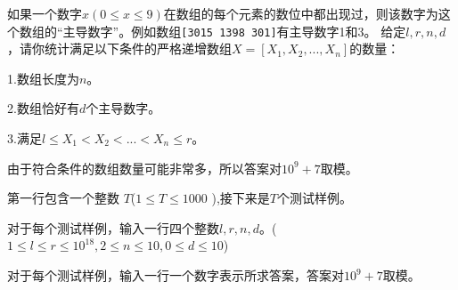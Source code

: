 
如果一个数字$x(0\leqslant x \leqslant 9)$在数组的每个元素的数位中都出现过，则该数字为这个数组的“主导数字”。例如数组\verb|[3015 1398 301]|有主导数字1和3。
给定$l,r,n,d$，请你统计满足以下条件的严格递增数组$X=[X_1,X_2,...,X_n]$的数量：

1.数组长度为$n$。

2.数组恰好有$d$个主导数字。

3.满足$l\leqslant X_1<X_2<...<X_n\leqslant r$。

由于符合条件的数组数量可能非常多，所以答案对$10^9+7$取模。


第一行包含一个整数 $T$($1 \leqslant T \leqslant 1000$  ),接下来是$T$个测试样例。

对于每个测试样例，输入一行四个整数$l,r,n,d$。($1\leqslant l \leqslant r\leqslant 10^{18},2\leqslant n \leqslant 10,0\leqslant d\leqslant 10$)


对于每个测试样例，输入一行一个数字表示所求答案，答案对$10^9+7$取模。

